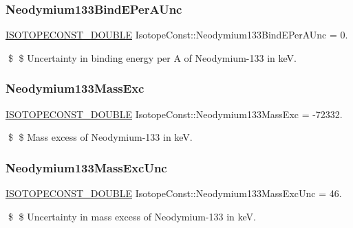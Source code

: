 \subsubsection{\texorpdfstring{Neodymium133\+Bind\+E\+Per\+A\+Unc}{Neodymium133BindEPerAUnc}}
{\footnotesize\ttfamily \mbox{\hyperlink{group___isotope_const-_macros_ga8f45a7272ce02c0b4c65c44636ed719a}{I\+S\+O\+T\+O\+P\+E\+C\+O\+N\+S\+T\+\_\+\+D\+O\+U\+B\+LE}} Isotope\+Const\+::\+Neodymium133\+Bind\+E\+Per\+A\+Unc = 0.}

\$ \$ Uncertainty in binding energy per A of Neodymium-\/133 in keV. \mbox{\label{group___isotope_const-_neodymium-_nd133_gad73118c9adb15d0d2404bcdcc4ec8fd3}} 
\subsubsection{\texorpdfstring{Neodymium133\+Mass\+Exc}{Neodymium133MassExc}}
{\footnotesize\ttfamily \mbox{\hyperlink{group___isotope_const-_macros_ga8f45a7272ce02c0b4c65c44636ed719a}{I\+S\+O\+T\+O\+P\+E\+C\+O\+N\+S\+T\+\_\+\+D\+O\+U\+B\+LE}} Isotope\+Const\+::\+Neodymium133\+Mass\+Exc = -\/72332.}

\$ \$ Mass excess of Neodymium-\/133 in keV. \mbox{\label{group___isotope_const-_neodymium-_nd133_gadccdbe7fb0447d648e1f918bd61ec6a0}} 
\subsubsection{\texorpdfstring{Neodymium133\+Mass\+Exc\+Unc}{Neodymium133MassExcUnc}}
{\footnotesize\ttfamily \mbox{\hyperlink{group___isotope_const-_macros_ga8f45a7272ce02c0b4c65c44636ed719a}{I\+S\+O\+T\+O\+P\+E\+C\+O\+N\+S\+T\+\_\+\+D\+O\+U\+B\+LE}} Isotope\+Const\+::\+Neodymium133\+Mass\+Exc\+Unc = 46.}

\$ \$ Uncertainty in mass excess of Neodymium-\/133 in keV. \mbox{\label{group___isotope_const-_neodymium-_nd133_ga2ef6efcfed41b68f5e43a53324c3c6e4}} 
